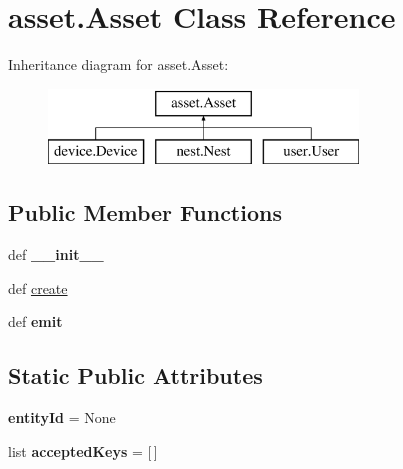 \hypertarget{classasset_1_1_asset}{\section{asset.\-Asset Class Reference}
\label{classasset_1_1_asset}
}
Inheritance diagram for asset.\-Asset\-:\begin{figure}[H]
\begin{center}
\leavevmode
\includegraphics[height=2.000000cm]{classasset_1_1_asset}
\end{center}
\end{figure}
\subsection*{Public Member Functions}
\begin{DoxyCompactItemize}
\item 
\hypertarget{classasset_1_1_asset_a1d5701776cb8a710192c9b1d356e76bc}{def {\bfseries \-\_\-\-\_\-init\-\_\-\-\_\-}}\label{classasset_1_1_asset_a1d5701776cb8a710192c9b1d356e76bc}

\item 
def \hyperlink{classasset_1_1_asset_a7628151c7b06d24d0150107681e90f59}{create}
\item 
\hypertarget{classasset_1_1_asset_aa64bdb5546de358c271232f0fb4863f8}{def {\bfseries emit}}\label{classasset_1_1_asset_aa64bdb5546de358c271232f0fb4863f8}

\end{DoxyCompactItemize}
\subsection*{Static Public Attributes}
\begin{DoxyCompactItemize}
\item 
\hypertarget{classasset_1_1_asset_ad539bb2223a6c5f80d432f07ff2742cf}{{\bfseries entity\-Id} = None}\label{classasset_1_1_asset_ad539bb2223a6c5f80d432f07ff2742cf}

\item 
\hypertarget{classasset_1_1_asset_a0cbfe18462e6929345578c21ce4603d7}{list {\bfseries accepted\-Keys} = \mbox{[}$\,$\mbox{]}}\label{classasset_1_1_asset_a0cbfe18462e6929345578c21ce4603d7}

\end{DoxyCompactItemize}


